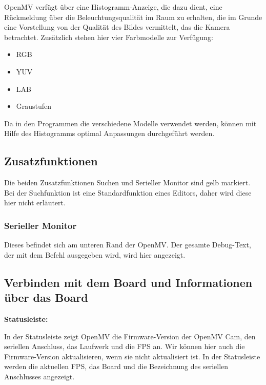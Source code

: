 OpenMV verfügt über eine Histogramm-Anzeige, die dazu dient, eine Rückmeldung über die Beleuchtungsqualität im Raum zu erhalten, die im Grunde eine Vorstellung von der Qualität des Bildes vermittelt, das die Kamera betrachtet. Zusätzlich stehen hier vier Farbmodelle zur Verfügung:

\begin{itemize}
  \item RGB
  \item YUV
  \item LAB
  \item Graustufen
\end{itemize}  
  
Da in den Programmen die verschiedene Modelle verwendet werden, können mit Hilfe des Histogramms optimal Anpassungen durchgeführt werden.  


\subsection{Zusatzfunktionen}

Die beiden Zusatzfunktionen \glqq Suchen\grqq{} und \glqq Serieller Monitor\grqq{} sind  gelb markiert. Bei der Suchfunktion ist eine Standardfunktion eines Editors, daher wird diese hier nicht erläutert. 



\subsubsection{Serieller Monitor}



Dieses befindet sich am unteren Rand der OpenMV. Der gesamte Debug-Text, der mit dem Befehl  ausgegeben wird, wird hier angezeigt.



\subsection{Verbinden mit dem Board und Informationen über das Board}




\textbf{Statusleiste:}

In der Statusleiste zeigt OpenMV die Firmware-Version der OpenMV Cam, den seriellen Anschluss, das Laufwerk und die FPS an. Wir können hier auch die Firmware-Version aktualisieren, wenn sie nicht aktualisiert ist. In der Statusleiste werden die aktuellen FPS, das Board und die Bezeichnung des seriellen Anschlusses angezeigt.


